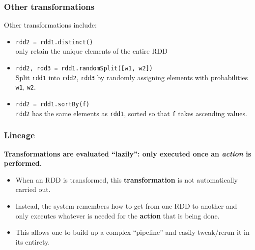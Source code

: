 \documentclass[english,serif,mathserif]{beamer}
\begin{document}
\begin{frame}[fragile]
  \frametitle{Other transformations}

  Other transformations include:
  \begin{itemize}
  \item \lstinline!rdd2 = rdd1.distinct()! \\
    only retain the unique elements of the entire RDD
  \item \lstinline|rdd2, rdd3 = rdd1.randomSplit([w1, w2])| \\
    Split \texttt{rdd1} into \texttt{rdd2}, \texttt{rdd3} by randomly
    assigning elements with probabilities \texttt{w1}, \texttt{w2}.
  \item \lstinline!rdd2 = rdd1.sortBy(f)! \\
    \texttt{rdd2} has the same elements as \texttt{rdd1}, sorted so
    that \texttt{f} takes ascending values.
\end{itemize}
\end{frame}


\begin{frame}
  \frametitle{Lineage}

  \textbf{Transformations are evaluated ``lazily'': only executed once an
    \emph{action} is performed.}

  \begin{itemize}
  \item
    When an RDD is transformed, this \textbf{transformation} is not
    automatically carried out.
  \item
    Instead, the system remembers how to get from one RDD to another and
    only executes whatever is needed for the \textbf{action} that is being
    done.
  \item
    This allows one to build up a complex ``pipeline'' and easily
    tweak/rerun it in its entirety.
  \end{itemize}
\end{frame}
\end{document}

